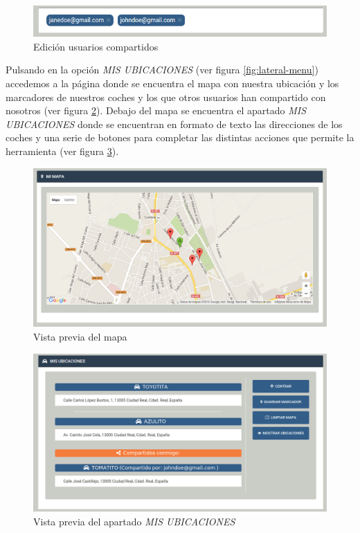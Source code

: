 	\begin{figure}[h!]
		\centering
		\includegraphics[width=15cm, fbox={\fboxrule} 4mm]{images/06-manual/09-my_car3.png}
		\caption{Edición usuarios compartidos}
		\label{fig:my-car3}
	\end{figure}

Pulsando en la opción \textit{MIS UBICACIONES} (ver figura \ref{fig:lateral-menu}) accedemos a la página donde se encuentra el mapa con nuestra ubicación y los marcadores de nuestros coches y los que otros usuarios han compartido con nosotros (ver figura \ref{fig:my-map}).
Debajo del mapa se encuentra el apartado \textit{MIS UBICACIONES} donde se encuentran en formato de texto las direcciones de los coches y una serie de botones para completar las distintas acciones que permite la herramienta (ver figura \ref{fig:my-map2}).

	\begin{figure}[h!]
		\centering
		\includegraphics[width=15cm, fbox={\fboxrule} 4mm]{images/06-manual/10-my_maps.png}
		\caption{Vista previa del mapa}
		\label{fig:my-map}
	\end{figure}

	\begin{figure}[h!]
		\centering
		\includegraphics[width=15cm, fbox={\fboxrule} 4mm]{images/06-manual/11-my_maps2.png}
		\caption{Vista previa del apartado \textit{MIS UBICACIONES}}
		\label{fig:my-map2}
	\end{figure}
	
